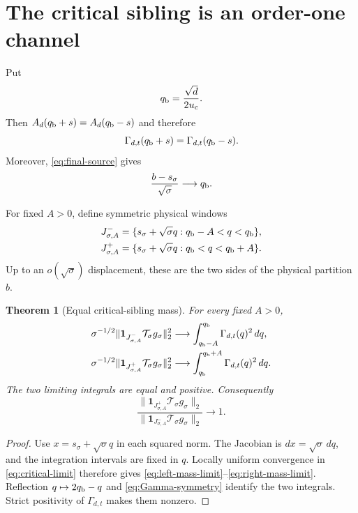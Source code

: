 \documentclass[11pt]{article}
\newtheorem{theorem}{Theorem}[section]
\theoremstyle{definition}
\theoremstyle{remark}
\newcommand{\uc}{u_{\mathrm c}}
\newcommand{\cT}{\mathcal T}
\begin{document}
\section{The critical sibling is an order-one channel}
\label{sec:sibling}

Put
\begin{equation}\label{eq:q-b}
 q_{\rm b}=\frac{\sqrt d}{2\uc}.
\end{equation}
Then $A_d(q_{\rm b}+s)=A_d(q_{\rm b}-s)$ and therefore
\begin{equation}\label{eq:Gamma-symmetry}
 \Gamma_{d,t}(q_{\rm b}+s)
 =\Gamma_{d,t}(q_{\rm b}-s).
\end{equation}
Moreover, \eqref{eq:final-source} gives
\begin{equation}\label{eq:b-coordinate}
 \frac{b-s_\sigma}{\sqrt\sigma}\longrightarrow q_{\rm b}.
\end{equation}

For fixed $A>0$, define symmetric physical windows
\begin{align}
 J^-_{\sigma,A}
 &=\{s_\sigma+\sqrt\sigma q:q_{\rm b}-A<q<q_{\rm b}\},
 \label{eq:left-window}\\
 J^+_{\sigma,A}
 &=\{s_\sigma+\sqrt\sigma q:q_{\rm b}<q<q_{\rm b}+A\}.
 \label{eq:right-window}
\end{align}
Up to an $o(\sqrt\sigma)$ displacement, these are the two sides of the
physical partition $b$.

\begin{theorem}[Equal critical-sibling mass]
\label{thm:sibling-mass}
For every fixed $A>0$,
\begin{align}
 \sigma^{-1/2}
 \|\mathbf1_{J^-_{\sigma,A}}\cT_\sigma g_\sigma\|_2^2
 &\longrightarrow
 \int_{q_{\rm b}-A}^{q_{\rm b}}\Gamma_{d,t}(q)^2\,dq,
 \label{eq:left-mass-limit}\\
 \sigma^{-1/2}
 \|\mathbf1_{J^+_{\sigma,A}}\cT_\sigma g_\sigma\|_2^2
 &\longrightarrow
 \int_{q_{\rm b}}^{q_{\rm b}+A}\Gamma_{d,t}(q)^2\,dq.
 \label{eq:right-mass-limit}
\end{align}
The two limiting integrals are equal and positive.  Consequently
\begin{equation}\label{eq:sibling-ratio}
 \boxed{
 \frac{
 \|\mathbf1_{J^+_{\sigma,A}}\cT_\sigma g_\sigma\|_2}
 {
 \|\mathbf1_{J^-_{\sigma,A}}\cT_\sigma g_\sigma\|_2}
 \longrightarrow1.}
\end{equation}
\end{theorem}

\begin{proof}
Use $x=s_\sigma+\sqrt\sigma q$ in each squared norm.  The Jacobian is
$dx=\sqrt\sigma\,dq$, and the integration intervals are fixed in $q$.
Locally uniform convergence in \eqref{eq:critical-limit} therefore gives
\eqref{eq:left-mass-limit}--\eqref{eq:right-mass-limit}.  Reflection
$q\mapsto2q_{\rm b}-q$ and \eqref{eq:Gamma-symmetry} identify the two
integrals.  Strict positivity of $\Gamma_{d,t}$ makes them nonzero.
\end{proof}
\end{document}
